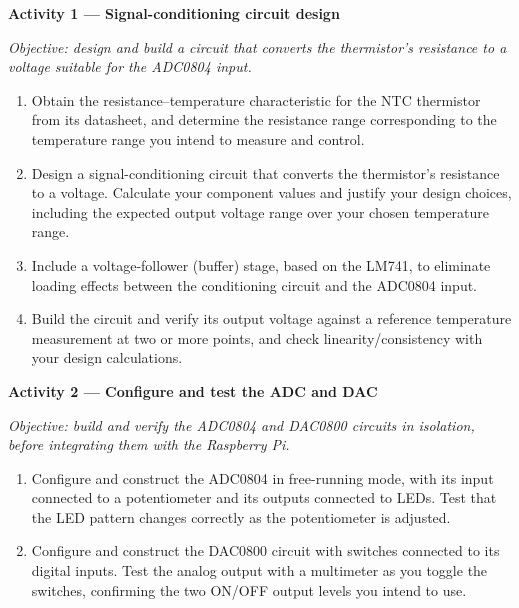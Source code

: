 \begin{procedure}

  \textbf{Activity 1 --- Signal-conditioning circuit design}\vspace{2pt}

  \textit{Objective: design and build a circuit that converts the thermistor's resistance to a voltage suitable for the ADC0804 input.}

  \begin{enumerate}
    \item Obtain the resistance--temperature characteristic for the NTC thermistor from its datasheet, and determine the resistance range corresponding to the temperature range you intend to measure and control.
    \item Design a signal-conditioning circuit that converts the thermistor's resistance to a voltage. Calculate your component values and justify your design choices, including the expected output voltage range over your chosen temperature range.
    \item Include a voltage-follower (buffer) stage, based on the LM741, to eliminate loading effects between the conditioning circuit and the ADC0804 input.
    \item Build the circuit and verify its output voltage against a reference temperature measurement at two or more points, and check linearity/consistency with your design calculations.
  \end{enumerate}
  \vspace*{1.5em}

  \textbf{Activity 2 --- Configure and test the ADC and DAC}\vspace{2pt}

  \textit{Objective: build and verify the ADC0804 and DAC0800 circuits in isolation, before integrating them with the Raspberry Pi.}

  \begin{enumerate}
    \item Configure and construct the ADC0804 in free-running mode, with its input connected to a potentiometer and its outputs connected to LEDs. Test that the LED pattern changes correctly as the potentiometer is adjusted.
    \item Configure and construct the DAC0800 circuit with switches connected to its digital inputs. Test the analog output with a multimeter as you toggle the switches, confirming the two ON/OFF output levels you intend to use.
  \end{enumerate}
  \newpage


\end{procedure}
